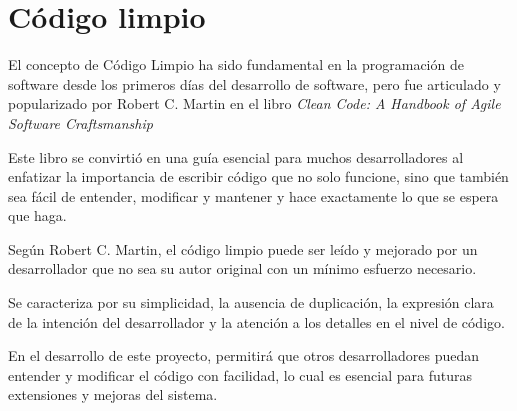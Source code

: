 \section{Código limpio}\label{sec:clean_code}

El concepto de Código Limpio ha sido fundamental en la programación de software desde los primeros días del desarrollo
de software, pero fue articulado y popularizado por Robert C. Martin en el libro
\textit{Clean Code: A Handbook of Agile Software Craftsmanship}~\cite{book_martin_2008}

Este libro se convirtió en una guía esencial para muchos desarrolladores al enfatizar la importancia de escribir código
que no solo funcione, sino que también sea fácil de entender, modificar y mantener y hace exactamente lo que se espera
que haga.

Según Robert C. Martin, el código limpio puede ser leído y mejorado por un desarrollador que no sea su autor original
con un mínimo esfuerzo necesario.

Se caracteriza por su simplicidad, la ausencia de duplicación, la expresión clara de la intención del desarrollador y
la atención a los detalles en el nivel de código.

En el desarrollo de este proyecto, permitirá que otros desarrolladores puedan entender y modificar el código con
facilidad, lo cual es esencial para futuras extensiones y mejoras del sistema.
